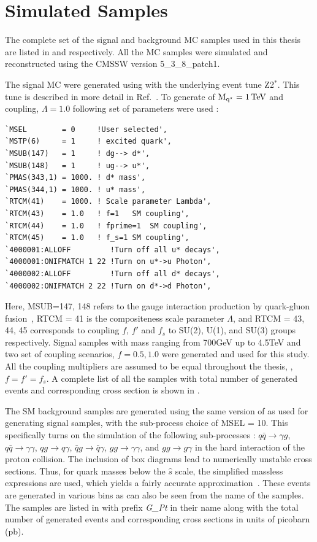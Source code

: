 \section{Simulated Samples}
The complete set of the signal and background MC samples used in this thesis are listed in \tab{\ref{Table:SigSamples}} and 
\tab{\ref{Table:BkgSamples}} respectively. All the MC samples were simulated and reconstructed using the CMSSW version 5\_3\_8\_patch1.

The \qstar signal MC were generated using  with the underlying event tune Z2$^{\ast}$. This tune is described in more detail in 
Ref.~\cite{Chatrchyan:2011id,Field:2010bc}. To generate \qstar of $\mathrm{M_{q^\star}}=1\mathrm{\,TeV}$ and coupling, $\Lambda=1.0$ following set of parameters 
were used :
\begin{verbatim}
`MSEL        = 0     !User selected',
`MSTP(6)     = 1     ! excited quark',
`MSUB(147)   = 1     ! dg--> d*',
`MSUB(148)   = 1     ! ug--> u*',
`PMAS(343,1) = 1000. ! d* mass',
`PMAS(344,1) = 1000. ! u* mass',
`RTCM(41)    = 1000. ! Scale parameter Lambda',
`RTCM(43)    = 1.0   ! f=1   SM coupling',
`RTCM(44)    = 1.0   ! fprime=1  SM coupling',
`RTCM(45)    = 1.0   ! f_s=1 SM coupling',
`4000001:ALLOFF         !Turn off all u* decays',
`4000001:ONIFMATCH 1 22 !Turn on u*->u Photon',
`4000002:ALLOFF         !Turn off all d* decays',
`4000002:ONIFMATCH 2 22 !Turn on d*->d Photon',
\end{verbatim}

Here, MSUB=147, 148 refers to the gauge interaction production by quark-gluon fusion~\cite{Baur:1989kv}, RTCM = 41 is the compositeness scale 
parameter $\Lambda$, and RTCM = 43, 44, 45 corresponds to coupling $f$, $f'$ and $f_{s}$ to SU(2), U(1), and SU(3) groups respectively.
Signal samples with \qstar mass ranging from 700\unit{GeV} up to 4.5\unit{TeV} and two set of coupling scenarios, $f=0.5, 1.0$ were generated 
and used for this study. All the coupling multipliers are assumed to be equal throughout the thesis, \ie, $f=f'=f_{s}$. A complete list of all 
the samples with total number of generated events and corresponding cross section is shown in \tab{\ref{Table:SigSamples}}. 

The SM \gamjet background samples are generated using the same version of \pythia as used for generating \qstar signal samples, with the sub-process 
choice of MSEL = 10. This specifically turns on the simulation of the following sub-processes : $q\bar{q}\rightarrow\gamma{g}$, $q\bar{q}\rightarrow\gamma\gamma$, $qg\rightarrow{q\gamma}$, $\bar{q}g\rightarrow{\bar{q}\gamma}$, $gg\rightarrow\gamma\gamma$, and $gg\rightarrow{g\gamma}$ in the hard 
interaction of the proton collision. The inclusion of box diagrams lead to numerically unstable cross sections. Thus, for quark masses below
the $\hat{s}$ scale, the simplified massless expressions are used, which yields a fairly accurate approximation~\cite{Sjostrand:2006za}. 
These events are generated in various \pt bins as can also be seen from the name of the samples. The samples are listed in \tab{\ref{Table:BkgSamples}} 
with prefix \emph{G\_Pt} in their name along with the total number of generated events and corresponding cross sections in units of picobarn (pb).


